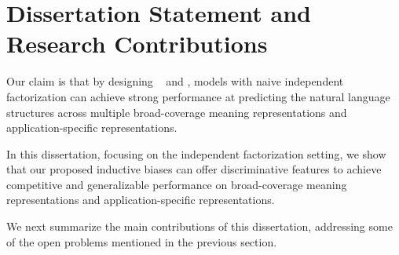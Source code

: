 \section[Dissertation Statement and Research
Contributions]{Dissertation Statement and \\Research Contributions}

\label{sec:intro-contri}

Our claim is that by designing ~ and
, models with naive
independent factorization can achieve strong performance at predicting
the natural language structures across multiple broad-coverage meaning
representations and application-specific representations.

In this dissertation, focusing on the independent factorization
setting, we show that our proposed inductive biases can offer
discriminative features to achieve competitive and generalizable
performance on broad-coverage meaning representations and
application-specific representations.

We next summarize the main contributions of this dissertation, addressing
some of the open problems mentioned in the previous section.

